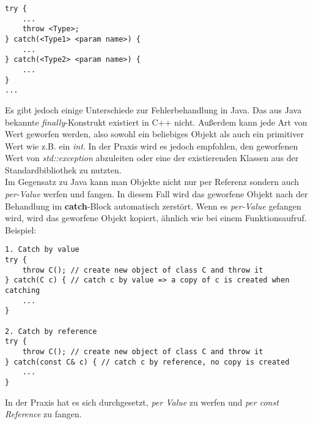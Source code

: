 \documentclass[
  accentcolor=tud1c,	%
  colorbacktitle,		%
  inverttitle,			%
  german,				%
  twoside
]{tudexercise}
\begin{document}
\begin{lstlisting}
try {
	...
	throw <Type>;
} catch(<Type1> <param name>) {
	...
} catch(<Type2> <param name>) {
	...
}
...
\end{lstlisting} 

Es gibt jedoch einige Unterschiede zur Fehlerbehandlung in Java. Das aus Java bekannte \emph{finally}-Konstrukt existiert in C++ nicht. Außerdem kann jede Art von Wert geworfen werden, also sowohl ein beliebiges Objekt als auch ein primitiver Wert wie z.B. ein \emph{int}. In der Praxis wird es jedoch empfohlen,  den geworfenen Wert von \emph{std::exception} abzuleiten oder eine der existierenden Klassen aus der Standardbibliothek zu nutzten. \\

Im Gegensatz zu Java kann man Objekte nicht nur per Referenz sondern auch \emph{per-Value} werfen und fangen. In diesem Fall wird das geworfene Objekt nach der Behandlung im \textbf{catch}-Block automatisch zerstört. Wenn es \emph{per-Value} gefangen wird, wird das geworfene Objekt kopiert, ähnlich wie bei einem Funktionsaufruf. Beispiel:

\begin{lstlisting}
1. Catch by value
try {
	throw C(); // create new object of class C and throw it 
} catch(C c) { // catch c by value => a copy of c is created when catching
	...
}

2. Catch by reference
try {
	throw C(); // create new object of class C and throw it 
} catch(const C& c) { // catch c by reference, no copy is created
	...
}
\end{lstlisting} 

In der Praxis hat es sich durchgesetzt, \emph{per Value} zu werfen und \emph{per const Reference} zu fangen.
\end{document}
